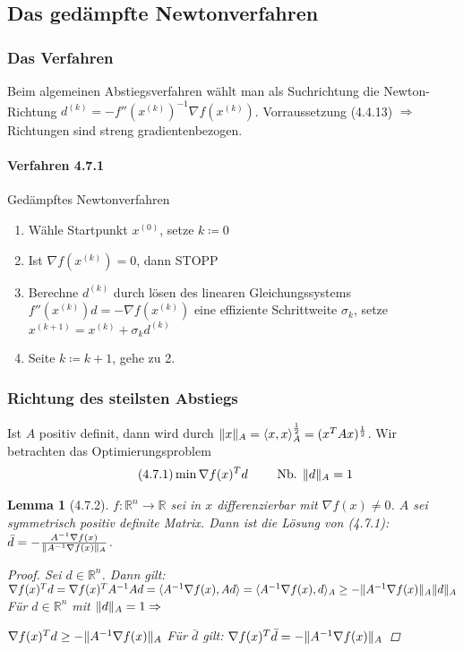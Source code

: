 \documentclass[ngerman,halfparskip]{scrartcl}
\DeclarePairedDelimiter{\norm}{\lVert}{\rVert}
\newtheorem*{lemma}{Lemma}
\theoremstyle{definition}
\newcommand*{\R}{\mathbb{R}}      %
\begin{document}
\subsection{Das gedämpfte Newtonverfahren}
\subsubsection{Das Verfahren}
Beim algemeinen Abstiegsverfahren wählt man als Suchrichtung die Newton-Richtung $d^{(k)}=-f''(x^{(k)})^{-1}\nabla f(x^{(k)})$. Vorraussetzung (4.4.13) $\Rightarrow$ Richtungen sind streng gradientenbezogen.

\paragraph{Verfahren 4.7.1} Gedämpftes Newtonverfahren

\begin{enumerate}
\item Wähle Startpunkt $x^{(0)}$, setze $k\coloneqq 0$
\item Ist $\nabla f(x^{(k)})=0$, dann STOPP
\item Berechne $d^{(k)}$ durch lösen des linearen Gleichungssystems $f''(x^{(k)})d=-\nabla f(x^{(k)})$ eine effiziente Schrittweite $\sigma_k$, setze $x^{(k+1)}=x^{(k)}+\sigma_kd^{(k)}$
\item Seite $k\coloneqq k+1$, gehe zu 2.
\end{enumerate}

\subsubsection{Richtung des steilsten Abstiegs}
Ist $A$ positiv definit, dann wird durch $\norm{x}_A=\langle x,x \rangle ^{\frac 12}_A=(x^TAx)^{\frac 12}$. Wir betrachten das Optimierungsproblem
\begin{gather*}\tag{4.7.1}
\min \nabla f(x)^Td \qquad \text{ Nb. } \norm{d}_A=1
\end{gather*}

\begin{lemma}[4.7.2] $f\colon \R^n\rightarrow\R$ sei in $x$ differenzierbar mit $\nabla f(x)\neq 0$. $A$ sei symmetrisch positiv definite Matrix. Dann ist die Lösung von (4.7.1): $\bar d=-\frac{A^{-1}\nabla f(x)}{\norm{A^{-1}\nabla f (x)}_A}$.
\begin{proof}
Sei $d\in\R^n$. Dann gilt: $\nabla f(x)^T d = \nabla f(x)^T A^{-1}Ad= \langle A^{-1}\nabla f (x) , Ad \rangle = \langle A^{-1} \nabla f(x), d \rangle _A \geq - \norm{A^{-1}\nabla f(x)}_A\norm{d}_A$ Für $d\in\R^n$ mit $\norm{d}_A=1 \Rightarrow$

$\nabla f(x)^T d \geq -\norm{A^{-1}\nabla f(x)}_A$ Für $\bar d$ gilt: $\nabla f(x)^T\bar d=-\norm{A^{-1}\nabla f(x)}_A$
\end{proof}
\end{lemma}
\end{document}

